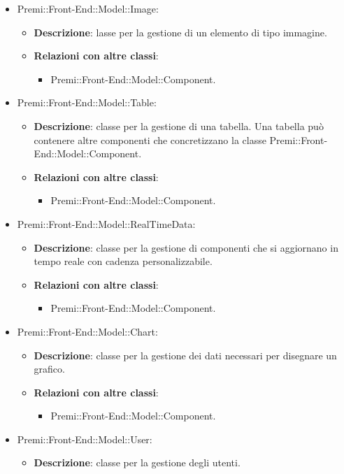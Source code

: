 \begin{itemize}
		 \item Premi::Front-End::Model::Image:
			\begin{itemize}
				\item \textbf{Descrizione}: lasse per la gestione di un elemento di tipo immagine.
				\item \textbf{Relazioni con altre classi}:
				\begin{itemize}
					\item Premi::Front-End::Model::Component.
				\end{itemize}
			 \end{itemize}

		 \item Premi::Front-End::Model::Table:
			\begin{itemize}
				\item \textbf{Descrizione}: classe per la gestione di una tabella. Una tabella può contenere altre componenti che concretizzano la classe Premi::Front-End::Model::Component.
				\item \textbf{Relazioni con altre classi}:
				\begin{itemize}
					\item Premi::Front-End::Model::Component.
				\end{itemize}
			 \end{itemize}

		 \item Premi::Front-End::Model::RealTimeData:
			\begin{itemize}
				\item \textbf{Descrizione}: classe per la gestione di componenti che si aggiornano in tempo reale con cadenza personalizzabile.
				\item \textbf{Relazioni con altre classi}:
				\begin{itemize}
					\item Premi::Front-End::Model::Component.
				\end{itemize}
			 \end{itemize}
		
		 \item Premi::Front-End::Model::Chart: 
			\begin{itemize}
				\item \textbf{Descrizione}: classe per la gestione dei dati necessari per disegnare un grafico.
				\item \textbf{Relazioni con altre classi}:
				\begin{itemize}
					\item Premi::Front-End::Model::Component.
				\end{itemize}
			 \end{itemize}
		
		 \item Premi::Front-End::Model::User:
			\begin{itemize}
				\item \textbf{Descrizione}: classe per la gestione degli utenti.
			 \end{itemize}

		\end{itemize}
		
